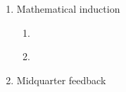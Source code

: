 \begin{enumerate}
\begin{enumerate}
\end{enumerate}
\item Mathematical induction
\begin{enumerate}
    \item \hspace{1in}\\ 
    \item \hspace{1in}\\ 
\end{enumerate}
\item Midquarter feedback
\end{enumerate}


